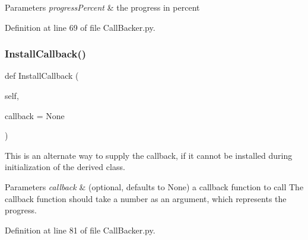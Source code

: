 \begin{DoxyParams}{Parameters}
{\em progress\+Percent} & the progress in percent \\
\hline
\end{DoxyParams}


Definition at line 69 of file Call\+Backer.\+py.

\mbox{\label{classSignalIntegrity_1_1CallBacker_1_1CallBacker_a9307eb7d2258b5f1df8bfc5f43effcab}} 
\subsubsection{\texorpdfstring{Install\+Callback()}{InstallCallback()}}
{\footnotesize\ttfamily def Install\+Callback (\begin{DoxyParamCaption}\item[{}]{self,  }\item[{}]{callback = {\ttfamily None} }\end{DoxyParamCaption})}



This is an alternate way to supply the callback, if it cannot be installed during initialization of the derived class. 


\begin{DoxyParams}{Parameters}
{\em callback} & (optional, defaults to None) a callback function to call The callback function should take a number as an argument, which represents the progress. \\
\hline
\end{DoxyParams}


Definition at line 81 of file Call\+Backer.\+py.

\mbox{\label{classSignalIntegrity_1_1CallBacker_1_1CallBacker_ac93a2d2ea7a87653318147244b98b31c}} 
